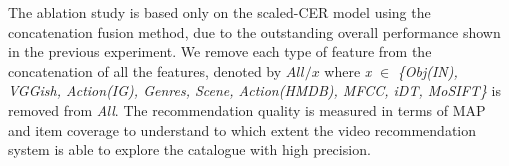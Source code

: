 \documentclass[review]{elsarticle}
\begin{document}
The ablation study is based only on the scaled-CER model using the concatenation fusion method, due to the outstanding overall performance shown in the previous experiment. We remove each type of feature from the concatenation of all the features, denoted by $All/x$ where \textit{x} $\in$ \textit{\{Obj(IN), VGGish, Action(IG), Genres, Scene, Action(HMDB), MFCC, iDT, MoSIFT\}} is removed from \textit{All}. The recommendation quality is measured in terms of MAP and item coverage to understand to which extent the video recommendation system is able to explore the catalogue with high precision. 

			\begin{table}[H]
\caption{Ablation study of the importance of all video content features explored in this work in the overall recommendation quality in terms of MAP and item coverage. \textit{All/x} denotes removing \textit{x} from the concatenation of all the video content features. The best results across the respective metric are highlighted in bold. The box around the $5^{th}$ row highlights the highest MAP results obtained in this work.}
  \label{tab:ablation_study}
  \centering
\end{table}
\end{document}

